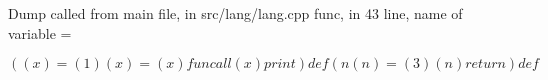 \documentclass{article}
\begin{document}
Dump called from main file, in src/lang/lang.cpp func, in 43 line, name of variable = 


$$
((x) = (1)(x) = (x) funcall (x) print ) def (n(n) = (3)(n) return ) def 
$$
\end{document}
